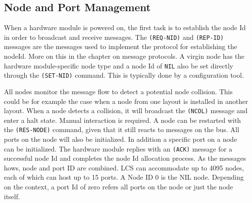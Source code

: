 \subsection{Node and Port Management}

When a hardware module is powered on, the first task is to establish the node Id in order to broadcast and receive messages. The \texttt{(REQ-NID)} and \texttt{(REP-ID)} messages are the messages used to implement the protocol for establishing the nodeId. More on this in the chapter on message protocols. A virgin node has the hardware module-specific node type and a node Id of \texttt{NIL} also be set directly through the \texttt{(SET-NID)} command. This is typically done by a configuration tool.

\begin{table}[ht!]
    \centering 
    \caption{Node Id Management}
\end{table}

All nodes monitor the message flow to detect a potential node collision. This could be for example the case when a node from one layout is installed in another layout. When a node detects a collision, it will broadcast the \texttt{(NCOL)} message and enter a halt state. Manual interaction is required. A node can be restarted with the \texttt{(RES-NODE)} command, given that it still reacts to messages on the bus. All ports on the node will also be initialized. In addition a specific port on a node can be initialized. The hardware module replies with an \texttt{(ACK)} message for a successful node Id and completes the node Id allocation process. As the messages hows, node and port ID are combined. LCS can accommodate up to 4095 nodes, each of which can host up to 15 ports. A Node ID 0 is the NIL node. Depending on the context, a port Id of zero refers all ports on the node or just the node itself.

